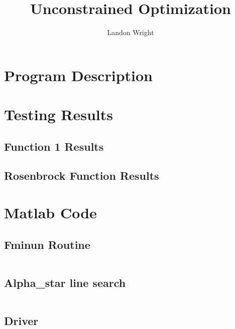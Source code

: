 \documentclass{article}
\begin{document}
\title{Unconstrained Optimization}
\author{Landon Wright}
\maketitle
\section{Program Description}
\section{Testing Results}
\subsection{Function 1 Results}



\subsection{Rosenbrock Function Results}





\section{Matlab Code}

\subsection{Fminun Routine}
\inputminted[xleftmargin=20pt,linenos]{matlab}{fminun.m}
\subsection{Alpha\_star line search}
\inputminted[xleftmargin=20pt, linenos]{matlab}{aPrime.m}
\subsection{Driver}
\inputminted[xleftmargin=20pt,linenos]{matlab}{fminunDriv.m}


\end{document}
